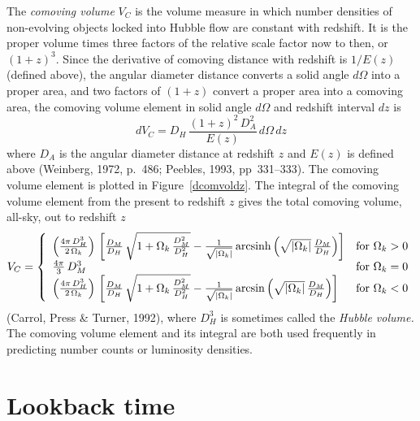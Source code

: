 The {\em comoving volume\/} $V_C$ is the volume measure in which
number densities of non-evolving objects locked into Hubble flow are
constant with redshift.  It is the proper volume times three factors
of the relative scale factor now to then, or $(1+z)^3$.  Since the
derivative of comoving distance with redshift is $1/E(z)$ (defined
above), the angular diameter distance converts a solid angle $d\Omega$
into a proper area, and two factors of $(1+z)$ convert a proper area
into a comoving area, the comoving volume element in solid angle
$d\Omega$ and redshift interval $dz$ is
\begin{equation}
dV_C= D_H\,\frac{(1+z)^2\,D_A^2}{E(z)}\,d\Omega\,dz
\end{equation}
where $D_A$ is the angular diameter distance at redshift $z$ and
$E(z)$ is defined above (Weinberg, 1972, p.~486; Peebles, 1993,
pp~331--333).  The comoving volume element is plotted in
Figure~\ref{dcomvoldz}.  The integral of the comoving volume element
from the present to redshift $z$ gives the total comoving volume,
all-sky, out to redshift $z$
\begin{equation}
V_C = \left\{
\begin{array}{ll}
  \left(\frac{4\pi\,D_H^3}{2\,\Omega_k}\right)\,
  \left[\frac{D_M}{D_H}\,
  \sqrt{1+\Omega_k\,\frac{D_M^2}{D_H^2}}
  -\frac{1}{\sqrt{|\Omega_k|}}\,
  {\rm arcsinh}\left(\sqrt{|\Omega_k|}\,\frac{D_M}{D_H}\right)\right]
  & {\rm for}~\Omega_k>0 \\
  \frac{4\pi}{3}\,D_M^3
  & {\rm for}~\Omega_k=0 \\
  \left(\frac{4\pi\,D_H^3}{2\,\Omega_k}\right)\,
  \left[\frac{D_M}{D_H}\,
  \sqrt{1+\Omega_k\,\frac{D_M^2}{D_H^2}}
  -\frac{1}{\sqrt{|\Omega_k|}}\,
  {\rm arcsin}\left(\sqrt{|\Omega_k|}\,\frac{D_M}{D_H}\right)\right]
  & {\rm for}~\Omega_k<0
\end{array}
\right.
\end{equation}
(Carrol, Press \& Turner, 1992), where $D_H^3$ is sometimes called the
{\em Hubble volume.\/} The comoving volume element and its integral
are both used frequently in predicting number counts or luminosity
densities.


\section{Lookback time}

